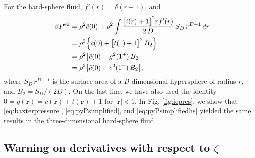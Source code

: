 \documentclass[preprint]{revtex4-1}
\newcommand{\vct}[1]{\mathbf{#1}}
\providecommand{\vr}{} %
\renewcommand{\vr}{\vct{r}}
\newcommand{\supex}[1]{ { { #1 }^{ \mathrm{ex} } } }
\newcommand{\Pex}{\supex{P}}
\begin{document}
For the hard-sphere fluid,
$f'(r) = \delta(r - 1)$, and
\begin{align}
  -\beta \Pex
&=
  \rho^2 \tilde{c}(0)
  +
  \rho^2 \int
    \frac{ \big[ t(r) + 1 \big]^2 r f'(r) }
         { 2 \, D }
  \, S_D \, r^{D-1} \, dr
\notag
\\
&=
  \rho^2
  \Bigl\{
    \tilde{c}(0)
  +
  \big[ t(1) + 1 \big]^2 \, B_2
  \Bigr\}
\notag \\
&=
  \rho^2
  \bigl[
    \tilde{c}(0)
  +
    g^2(1^+) \, B_2
  \bigr]
\notag \\
&=
  \rho^2
  \bigl[
    \tilde{c}(0)
  +
    c^2(1^-) \, B_2
  \bigr],
  \label{eq:pyPsimplifiedhs}
\end{align}
%
where
$S_D \, r^{D-1}$ is the surface area of a $D$-dimensional hypersphere of radius $r$,
and $B_2 = S_D / (2D)$.
%
On the last line, we have also used the identity
$0 = g(\vr) = c(\vr) + t(\vr) + 1$
for $|\vr| < 1$.
%
In Fig. \ref{fig:iepres},
we show that
\eqref{eq:baxterpressure},
\eqref{eq:pyPsimplified},
and
\eqref{eq:pyPsimplifiedhs}
yielded the same results
in the three-dimensional hard-sphere fluid.



\subsection{Warning on derivatives with respect to $\zeta$}
\end{document}
